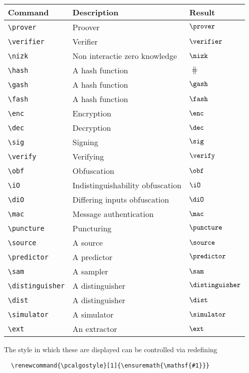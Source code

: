 \documentclass[a4paper]{report}
\begin{document}
  
  \begin{center}
  \begin{tabular}{l l l}
  \textbf{Command} & \textbf{Description} & \textbf{Result} \\\hline
  \lstinline$\prover$ & Proover & $\prover$  \\
  \lstinline$\verifier$ & Verifier & $\verifier$  \\
  \lstinline$\nizk$ & Non interactie zero knowledge & $\nizk$  \\
  \lstinline$\hash$ & A hash function & $\hash$  \\
  \lstinline$\gash$ & A hash function& $\gash$  \\
  \lstinline$\fash$ & A hash function & $\fash$  \\
  \lstinline$\enc$ & Encryption  & $\enc$  \\
  \lstinline$\dec$ & Decryption & $\dec$  \\
  \lstinline$\sig$ & Signing & $\sig$  \\
  \lstinline$\verify$ & Verifying & $\verify$  \\
  \lstinline$\obf$ & Obfuscation & $\obf$  \\
  \lstinline$\iO$ & Indistinguishability obfuscation & $\iO$  \\
  \lstinline$\diO$ & Differing inputs obfuscation & $\diO$  \\
  \lstinline$\mac$ & Message authentication & $\mac$  \\
  \lstinline$\puncture$ & Puncturing & $\puncture$  \\
  \lstinline$\source$ & A source & $\source$  \\
  \lstinline$\predictor$ & A predictor & $\predictor$  \\
  \lstinline$\sam$ & A sampler & $\sam$  \\
  \lstinline$\distinguisher$ & A distinguisher & $\distinguisher$  \\
  \lstinline$\dist$ & A distinguisher& $\dist$  \\
  \lstinline$\simulator$ & A simulator & $\simulator$  \\
  \lstinline$\ext$ & An extractor & $\ext$  
  \end{tabular}
  \end{center}
  
  The style in which these are displayed can be controlled via redefining
  \begin{lstlisting}
  \renewcommand{\pcalgostyle}[1]{\ensuremath{\mathsf{#1}}}
  \end{lstlisting}
  
\end{document}
